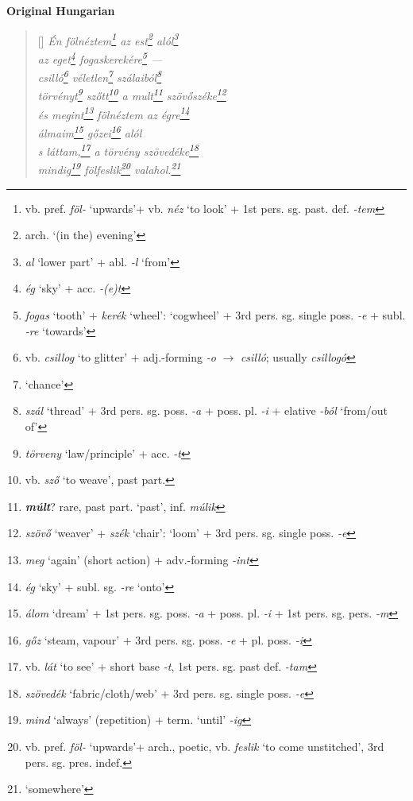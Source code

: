 \documentclass[a4paper,12pt,twoside,final]{book}
\begin{document}
\newpage


\noindent \textbf{Original Hungarian}



\settowidth{\versewidth}{törvényt szőtt a mult szövőszéke}

\begin{verse}[\versewidth]
  \it
  Én fölnéztem\footnote{vb. pref. \emph{föl-} `upwards'+ vb.
  \emph{néz} `to look' + 1st pers. sg. past. def. \emph{-tem}} az
  est\footnote{arch. `(in the) evening'} alól\footnote{\emph{al}
  `lower part' + abl. \emph{-l} `from'} \\
  az eget\footnote{\emph{ég} `sky' + acc. \emph{-(e)t}}
  fogaskerekére\footnote{\emph{fogas} `tooth' +
  \emph{kerék} `wheel': `cogwheel' + 3rd pers. sg. single
  poss. \emph{-e} + subl. \emph{-re} `towards'} --- \\
  csilló\footnote{vb. \emph{csillog} `to glitter' +
  adj.-forming \emph{-o} $\rightarrow$
  \emph{csilló}; usually \emph{csillogó}}
  véletlen\footnote{`chance'} szálaiból\footnote{\emph{szál}
  `thread' + 3rd pers. sg. poss. \emph{-a} + poss. pl. \emph{-i} +
  elative \emph{-ból} `from/out of'} \\
  törvényt\footnote{\emph{törveny} `law/principle' + acc. \emph{-t}}
  szőtt\footnote{vb. \emph{sző} `to weave', past part.} a
  mult\footnote{\textbf{\emph{múlt}}? rare, past part. `past',
  inf. \emph{múlik}} szövőszéke\footnote{\emph{szövő} `weaver' +
  \emph{szék} `chair': `loom' + 3rd pers. sg. single poss. \emph{-e}} \\
  és megint\footnote{\emph{meg} `again' (short action) +
  adv.-forming \emph{-int}} fölnéztem az égre\footnote{\emph{ég}
  `sky' + subl. sg. \emph{-re} `onto'} \\
  álmaim\footnote{\emph{álom} `dream' +
  1st pers. sg. poss. \emph{-a} + poss. pl. \emph{-i} + 1st
  pers. sg. pers. \emph{-m}} gőzei\footnote{\emph{gőz} `steam,
  vapour' + 3rd pers. sg. poss. \emph{-e} + pl. poss. \emph{-i}} alól \\
  s láttam,\footnote{vb. \emph{lát} `to see' +
  short base \emph{-t}, 1st pers. sg. past def. \emph{-tam}} a törvény
  szövedéke\footnote{\emph{szövedék} `fabric/cloth/web' + 3rd
  pers. sg. single poss. \emph{-e}} \\
  mindig\footnote{\emph{mind} `always' (repetition) + term. `until'
  \emph{-ig}} fölfeslik\footnote{vb. pref. \emph{föl-} `upwards'+
  arch., poetic, vb.
  \emph{feslik} `to come unstitched', 3rd pers. sg. pres. indef.}
  valahol.\footnote{`somewhere'} \\
\end{verse}
\end{document}
